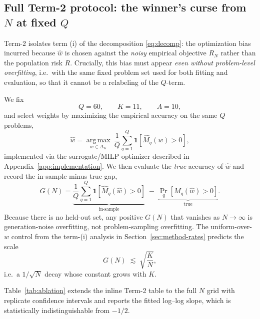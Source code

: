 \documentclass{article} %
\providecommand{\argmax}{\mathop{\mathrm{arg\,max}}\limits}
\providecommand{\simplex}{\Delta_K}
\providecommand{\Mhat}{\widehat{M}}
\providecommand{\what}{\widehat{w}}
\begin{document}
\subsection{Full Term-2 protocol: the winner's curse from
\texorpdfstring{$N$}{N} at fixed \texorpdfstring{$Q$}{Q}}
\label{app:exp-channel2}

Term-2 isolates term (i) of the decomposition \eqref{eq:decomp}: the
optimization bias incurred because $\what$ is chosen against the
\emph{noisy} empirical objective $R_N$ rather than the population risk $R$.
Crucially, this bias must appear \emph{even without problem-level
overfitting}, i.e.\ with the same fixed problem set used for both fitting and
evaluation, so that it cannot be a relabeling of the $Q$-term.

We fix
\begin{equation}
\label{eq:e-c2-Q}
Q=60,
\qquad
K=11,
\qquad
A=10,
\end{equation}
and select weights by maximizing the empirical accuracy on the same $Q$
problems,
\begin{equation}
\label{eq:e-c2-fit}
\what=\argmax_{w\in\simplex}
\ \frac1Q\sum_{q=1}^Q
\mathbf 1\!\left[\Mhat_q(w)>0\right],
\end{equation}
implemented via the surrogate/MILP optimizer described in
Appendix~\ref{app:implementation}.  We then evaluate the \emph{true} accuracy
of $\what$ and record the in-sample minus true gap,
\begin{equation}
\label{eq:e-c2-gap}
G(N)=
\underbrace{\frac1Q\sum_{q=1}^Q \mathbf 1[\Mhat_q(\what)>0]}_{\text{in-sample}}
\;-\;
\underbrace{\Pr_q[M_q(\what)>0]}_{\text{true}}.
\end{equation}
Because there is no held-out set, any positive $G(N)$ that vanishes as
$N\to\infty$ is generation-noise overfitting, not problem-sampling
overfitting.  The uniform-over-$w$ control from the term-(i) analysis in
Section~\ref{sec:method-rates} predicts the scale
\begin{equation}
\label{eq:e-c2-rate}
G(N)\;\lesssim\;
\sqrt{\frac{K}{N}},
\end{equation}
i.e.\ a $1/\sqrt N$ decay whose constant grows with $K$.

Table~\ref{tab:ablation} extends the inline Term-2 table to the full $N$
grid with replicate confidence intervals and reports the fitted log--log
slope, which is statistically indistinguishable from $-1/2$.
\end{document}
